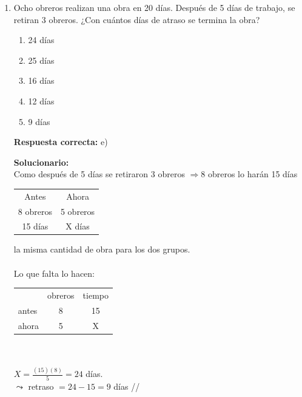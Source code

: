 \begin{enumerate}
	\vspace{2mm}
	\textbf{Solucionario:}\\
	$p$: hace calor. $\quad q$: estudia\\
	$\sim (p \wedge \sim q)$\\
	ley de morgan.\\
	$\sim p \vee q \equiv p \rightarrow q$\\
	$\therefore$ Estudio dado que hace calor.
	
	\vspace{6mm}
	
	\item Ocho obreros realizan una obra en 20 días. Después de 5 días de trabajo, se retiran 3 obreros. ¿Con cuántos días de atraso se termina la obra?
	\begin{enumerate}[label=\alph*)]
		\item 24 días
		\item 25 días
		\item 16 días
		\item 12 días
		\item 9 días
	\end{enumerate}
	\textbf{Respuesta correcta:} e)
	
	\vspace{2mm}
	\textbf{Solucionario:}\\
	Como después de 5 días se retiraron 3 obreros $\Rightarrow 8$ obreros lo harán 15 días\\
	\begin{tabular}{|c|c|}
		\hline
		Antes & Ahora \\
		8 obreros & 5 obreros \\
		15 días & X días \\
		\hline
	\end{tabular} la misma cantidad de obra para los dos grupos.\\
	\\
	Lo que falta lo hacen:\\
	\begin{tabular}{lcc}
		& obreros & tiempo \\
		antes & 8       & 15 \\
		ahora & 5       & X
	\end{tabular}\\
	\\
	$X = \frac{(15)(8)}{5} = 24$ días.\\
	$\leadsto$ retraso $= 24 - 15 = 9$ días //
	
	\vspace{6mm}
	

\end{enumerate}
